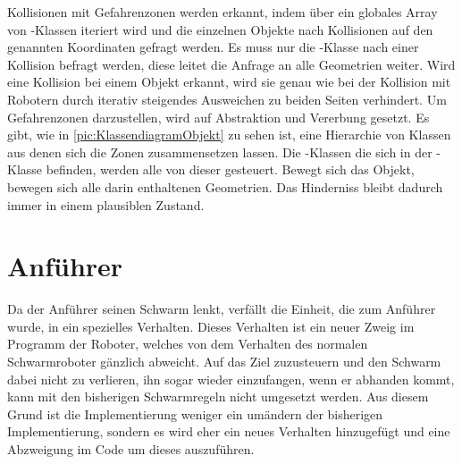 Kollisionen mit Gefahrenzonen werden erkannt, indem über ein globales Array von -Klassen iteriert wird und die einzelnen Objekte nach Kollisionen auf den genannten Koordinaten gefragt werden. Es muss nur die -Klasse nach einer Kollision befragt werden, diese leitet die Anfrage an alle Geometrien weiter. Wird eine Kollision bei einem Objekt erkannt, wird sie genau wie bei der Kollision mit Robotern durch iterativ steigendes Ausweichen zu beiden Seiten verhindert.
Um Gefahrenzonen darzustellen, wird auf Abstraktion und Vererbung gesetzt. Es gibt, wie in \autoref{pic:KlassendiagramObjekt} zu sehen ist, eine Hierarchie von Klassen aus denen sich die Zonen zusammensetzen lassen. Die -Klassen die sich in der -Klasse befinden, werden alle von dieser gesteuert. Bewegt sich das Objekt, bewegen sich alle darin enthaltenen Geometrien. Das Hinderniss bleibt dadurch immer in einem plausiblen Zustand. 


%










\section{Anführer}

Da der Anführer seinen Schwarm lenkt, verfällt die Einheit, die zum Anführer wurde, in ein spezielles Verhalten. Dieses Verhalten ist ein neuer Zweig im Programm der Roboter, welches von dem Verhalten des normalen Schwarmroboter gänzlich abweicht. Auf das Ziel zuzusteuern und den Schwarm dabei nicht zu verlieren, ihn sogar wieder einzufangen, wenn er abhanden kommt, kann mit den bisherigen Schwarmregeln nicht umgesetzt werden. Aus diesem Grund ist die Implementierung weniger ein umändern der bisherigen Implementierung, sondern es wird eher ein neues Verhalten hinzugefügt und eine Abzweigung im Code um dieses auszuführen.

